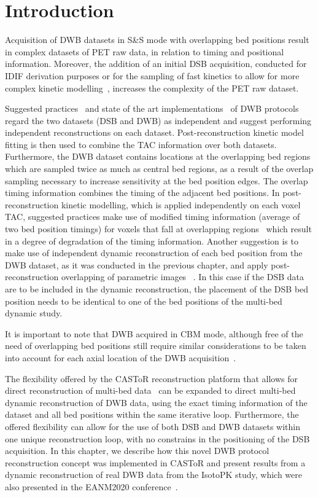 \section{Introduction}
Acquisition of DWB datasets in S\&S mode with overlapping bed positions result in complex datasets of PET raw data, in relation to timing and positional information. Moreover, the addition of an initial DSB acquisition, conducted for IDIF derivation purposes or for the sampling of fast kinetics to allow for more complex kinetic modelling~\cite{Zaker2020}, increases the complexity of the PET raw dataset. 

Suggested practices~\cite{Karakatsanis2013} and state of the art implementations~\cite{Hu2020} of DWB protocols regard the two datasets (DSB and DWB) as independent and suggest performing independent reconstructions on each dataset. Post-reconstruction kinetic model fitting is then used to combine the TAC information over both datasets. 
Furthermore, the DWB dataset contains locations at the overlapping bed regions which are sampled twice as much as central bed regions, as a result of the overlap sampling necessary to increase sensitivity at the bed position edges. The overlap timing information combines the timing of the adjacent bed positions. In post-reconstruction kinetic modelling, which is applied independently on each voxel TAC, suggested practices make use of modified timing information (average of two bed position timings) for voxels that fall at overlapping regions~\cite{Karakatsanis2013} which result in a degree of degradation of the timing information. Another suggestion is to make use of independent dynamic reconstruction of each bed position from the DWB dataset, as it was conducted in the previous chapter, and apply post-reconstruction overlapping of parametric images ~\cite{Karakatsanis2016a}. In this case if the DSB data are to be included in the dynamic reconstruction, the placement of the DSB bed position needs to be identical to one of the bed positions of the multi-bed dynamic study.

It is important to note that DWB acquired in CBM mode, although free of the need of overlapping bed positions still require similar considerations to be taken into account for each axial location of the DWB acquisition~\cite{Karakatsanis2016b,Hu2020}.

The flexibility offered by the CASToR reconstruction platform that allows for direct reconstruction of multi-bed data~\cite{Ross2004} can be expanded to direct multi-bed dynamic reconstruction of DWB data, using the exact timing information of the dataset and all bed positions within the same iterative loop. Furthermore, the offered flexibility can allow for the use of both DSB and DWB datasets within one unique reconstruction loop, with no constrains in the positioning of the DSB acquisition.
In this chapter, we describe how this novel DWB protocol reconstruction concept was implemented in CASToR and present results from a dynamic reconstruction of real DWB data from the IsotoPK study, which were also presented in the EANM2020 conference~\cite{chalampalakis2020EANM}.


